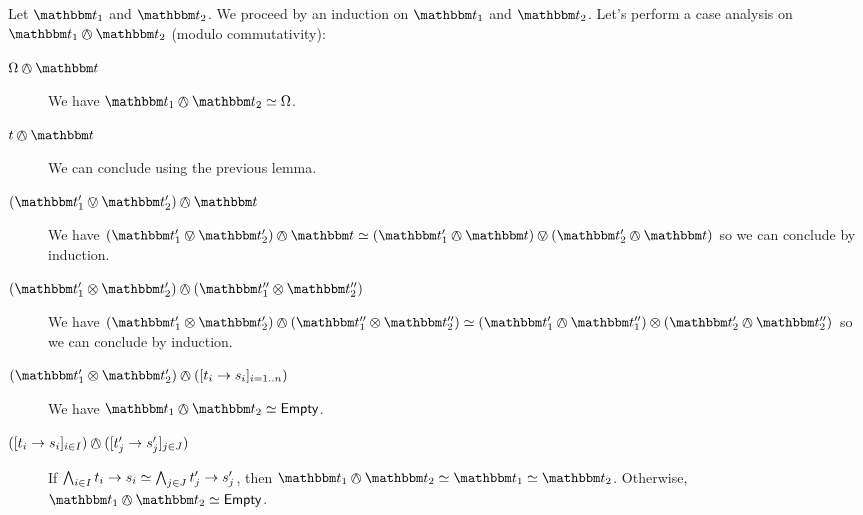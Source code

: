 \documentclass[a4paper]{article}
\theoremstyle{definition}
\begin{document}
    Let $\ts_1$ and $\ts_2$. We proceed by an induction on $\ts_1$ and $\ts_2$.
    Let's perform a case analysis on $\ts_1 \tsand \ts_2$ (modulo commutativity):
    \begin{description}
      \item[$\tsempty \tsand \ts$] We have $\ts_1 \tsand \ts_2 \simeq \tsempty$.
      \item[$t \tsand \ts$] We can conclude using the previous lemma.
      \item[$(\ts_1' \tsor \ts_2') \tsand \ts$] We have
      $(\ts_1' \tsor \ts_2') \tsand \ts \simeq (\ts_1' \tsand \ts) \tsor (\ts_2' \tsand \ts)$
      so we can conclude by induction.
      \item[$(\ts_1' \tstimes \ts_2') \tsand (\ts_1'' \tstimes \ts_2'')$] We have
      $(\ts_1' \tstimes \ts_2') \tsand (\ts_1'' \tstimes \ts_2'') \simeq (\ts_1' \tsand \ts_1'') \tstimes (\ts_2' \tsand \ts_2'')$
      so we can conclude by induction.
      \item[$(\ts_1' \tstimes \ts_2') \tsand (\tsfunone {t_i} {s_i}_{i=1..n})$] We have $\ts_1 \tsand \ts_2 \simeq \Empty$.
      \item[$(\tsfunone {t_i} {s_i}_{i\in I}) \tsand (\tsfunone {t_j'} {s_j'}_{j\in J})$]
      If $\bigwedge_{i\in I} t_i\to s_i \simeq \bigwedge_{j\in J} t_j'\to s_j'$,
      then $\ts_1 \tsand \ts_2 \simeq \ts_1 \simeq \ts_2$.
      Otherwise, $\ts_1 \tsand \ts_2 \simeq \Empty$.
    \end{description}
    
\end{document}
